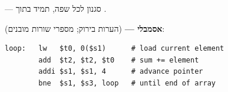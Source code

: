 %
%
%
%



\thispagestyle{empty}

 — סגנון לכל שפה, תמיד בתוך
.\par\bigskip

\noindent\textbf{אסמבלי — } (הערות \code{\#} בירוק; מספרי שורות מובנים):
\begin{asmblock}
\begin{lstlisting}[style=asm]
loop:   lw   $t0, 0($s1)      # load current element
        add  $t2, $t2, $t0    # sum += element
        addi $s1, $s1, 4      # advance pointer
        bne  $s1, $s3, loop   # until end of array
\end{lstlisting}
\end{asmblock}

